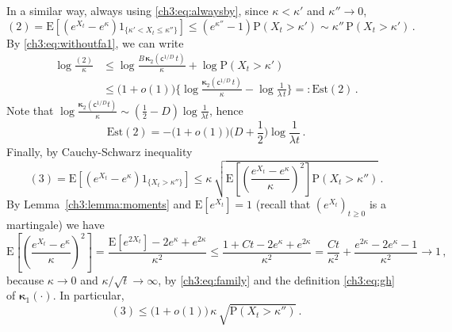 \documentclass[a4paper,reqno,11pt]{amsart}
\numberwithin{equation}{section}
\newcommand{\PEfont}{\mathrm}
\renewcommand{\P}{\ensuremath{\PEfont P}}
\newcommand{\E}{\ensuremath{\PEfont E}}
\newcommand\sfc{\mathsf{c}}
\newcommand\bkappa{\boldsymbol{\kappa}}
\begin{document}
In a similar way, always using \eqref{ch3:eq:alwaysby},
since $\kappa < \kappa'$ and $\kappa'' \to 0$,
\begin{equation}
 (2) = \E\left[(e^{X_t}-e^{\kappa})1_{\{\kappa' < X_t \le
\kappa''\}}\right] \leq (e^{\kappa''}-1) \P(X_t > \kappa')
 \sim \kappa'' \,\P(X_t>\kappa') \,.
\end{equation}
By \eqref{ch3:eq:withoutfa1},
we can write
\begin{equation}\label{eq:2}
 \begin{split}
	\log \frac{(2)}{\kappa} & \le 
	\log \frac{B\, \bkappa_2(\sfc^{1/D} \, t)}{\kappa}
	+ \log \P(X_t>\kappa') \\
	& \le \big( 1 + o(1) \big) \bigg\{ \log \frac{\bkappa_2(\sfc^{1/D} \, t)}{\kappa}
	-  \log \frac{1}{\lambda \, t} \bigg\} 
	=: \mathrm{Est}(2) \,.
\end{split}
\end{equation}
Note that $\log \frac{\bkappa_2(\sfc^{1/D}t)}{\kappa} \sim (\frac{1}{2}-D)
\log \frac{1}{\lambda t}$, hence
\begin{equation} \label{eq:est2}
	\mathrm{Est(2)} = -\big( 1+o(1) \big) \bigg(D+\frac{1}{2}\bigg)
	\log \frac{1}{\lambda t} \,.
\end{equation}
Finally, by Cauchy-Schwarz inequality 
\begin{equation} \label{ch3:eq:est30}
 (3) = \E\left[(e^{X_t}-e^{\kappa})1_{\{X_t>\kappa''\}}\right]
 \leq \kappa \, 
\sqrt{ \E\left[\left(\frac{e^{X_t}-e^{\kappa}}{\kappa}\right)^2\right]
\P(X_t>\kappa'')} \,. 
\end{equation}
By Lemma~\ref{ch3:lemma:moments} and $\E[e^{X_t}] = 1$
(recall that $(e^{X_t})_{t\ge 0}$ is a martingale) we have
\begin{equation*}
	\E\left[\left(\frac{e^{X_t}-e^{\kappa}}{\kappa}\right)^2\right]
	= \frac{\E[e^{2X_t}] - 2 e^\kappa + e^{2\kappa}}{\kappa^2}
	\le \frac{1 + C t - 2 e^\kappa + e^{2\kappa}}{\kappa^2}
	= \frac{C t}{\kappa^2} + \frac{e^{2\kappa}  - 2 e^\kappa -1}{\kappa^2} 
	\to 1 \,,
\end{equation*}
because $\kappa \to 0$ and $\kappa /\sqrt{t} \to \infty$, by \eqref{ch3:eq:family}
and the definition \eqref{ch3:eq:gh} of $\bkappa_1(\cdot)$. 
In particular, 
\begin{equation*}
	 (3)\leq \big(1+o(1)\big) \, \kappa \, \sqrt{\P(X_t>\kappa'')} \,.
\end{equation*}
\end{document}
